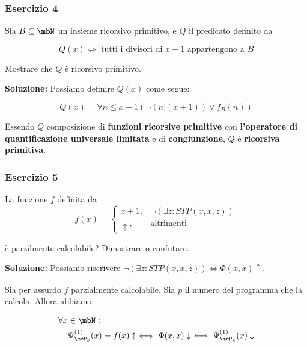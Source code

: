 \subsubsection{Esercizio 4}

Sia \(B\subseteq \mbN\) un insieme ricorsivo primitivo, e \(Q\) il predicato definito da

\begin{equation}
  Q(x) \iff \text{ tutti i divisori di } x+1 \text{ appartengono a } B
\end{equation}

Mostrare che \(Q\) è ricorsivo primitivo.

\textbf{Soluzione: } Possiamo definire \(Q(x)\) come segue:

\begin{equation}
  Q(x) = \forall n \leq x+1 (\neg (n \vert (x+1)) \lor f_B(n))
\end{equation}

Essendo \(Q\) composizione di \textbf{funzioni ricorsive primitive} con \textbf{l'operatore di quantificazione universale limitata} e di \textbf{congiunzione}, \(Q\) è \textbf{ricorsiva primitiva}.

\subsubsection{Esercizio 5}

La funzione \(f\) definita da
\begin{equation}
  f(x) = \begin{cases}
    x+1, & \neg(\exists z : STP(x,x,z))\\
    \uparrow, & \text{altrimenti}
  \end{cases}
\end{equation}

è parzilmente calcolabile? Dimostrare o confutare.

\textbf{Soluzione: } Possiamo riscrivere \(\neg(\exists z : STP(x,x,z)) \iff \Phi(x,x) \uparrow\).

Sia per assurdo \(f\) parzialmente calcolabile. Sia \(p\) il numero del programma che la calcola. Allora abbiamo:

\begin{equation}
  \begin{split}
    \forall x &\in \mbN:\\
    &\Psi_{\mcP_p}^{(1)}(x) = f(x) \uparrow \iff \Phi(x,x) \downarrow \iff \Psi_{\mcP_x}^{(1)}(x) \downarrow
  \end{split}
\end{equation}

